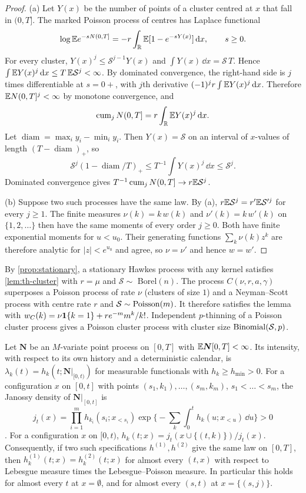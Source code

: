 \begin{proof}
(a) Let $Y(x)$ be the number of points of a cluster centred at $x$ that fall in
$(0,T]$. The marked Poisson process of centres has Laplace functional
\[
\log\mathbb{E} e^{-sN(0,T]}=-r\int_{\mathbb R}\mathbb{E}[1-e^{-sY(x)}]\,\mathrm{d} x,\qquad s\ge0 .
\]
For every cluster, $Y(x)^j\le \mathcal S^{j-1}Y(x)$ and $\int Y(x)\,\dd x=\mathcal S\,T$. Hence
$\int\mathbb{E} Y(x)^j\,\mathrm{d} x\le T\,\mathbb{E} \mathcal S^j<\infty$. By dominated convergence, the right-hand
side is $j$ times differentiable at $s=0+$, with $j$th derivative
$(-1)^jr\int\mathbb{E} Y(x)^j\,\mathrm{d} x$. Therefore $\mathbb{E} N(0,T]^j<\infty$ by monotone convergence,
and
\[
\operatorname{cum}_jN(0,T]=r\int_{\mathbb R}\mathbb{E} Y(x)^j\,\mathrm{d} x .
\]
Let $\operatorname{diam}=\max_iy_i-\min_iy_i$. Then $Y(x)=\mathcal S$ on an interval of
$x$-values of length $(T-\operatorname{diam})_+$, so
\[
\mathcal S^j(1-\operatorname{diam}/T)_+\le T^{-1}\int Y(x)^j\,\dd x\le \mathcal S^j .
\]
Dominated convergence gives $T^{-1}\operatorname{cum}_jN(0,T]\to r\mathbb{E} \mathcal S^j$.

(b) Suppose two such processes have the same law. By (a), $r\mathbb{E} \mathcal S^j=r'\mathbb{E} \mathcal S'^j$ for every
$j\ge1$. The finite measures $\nu(k)=k\,w(k)$ and $\nu'(k)=k\,w'(k)$ on
$\{1,2,\dots\}$ then have the same moments of every order $j\ge0$. Both have finite
exponential moments for $u<u_0$. Their generating functions
$\sum_k\nu(k)z^k$ are therefore analytic for $|z|<e^{u_0}$ and agree, so
$\nu=\nu'$ and hence $w=w'$.
\end{proof}

By \cref{prop:stationary}, a stationary Hawkes process with any kernel satisfies
\cref{lem:th-cluster} with $r=\mu$ and $\mathcal S\sim$ Borel$(n)$. The process
$C(\nu,r,a,\gamma)$ superposes a Poisson process of rate $\nu$ (clusters of size $1$)
and a Neyman--Scott process with centre rate $r$ and $\mathcal S\sim\operatorname{Poisson}(m)$. It therefore satisfies
the lemma with $w_C(k)=\nu\mathbf{1}\!\left\{k=1\right\}+r e^{-m}m^k/k!$. Independent $p$-thinning of a
Poisson cluster process gives a Poisson cluster process with cluster size
$\operatorname{Binomial}(\mathcal S,p)$.

\begin{lemma}\label{lem:th-janossy}
Let $\bm N$ be an $M$-variate point process on $[0,T]$ with $\mathbb{E}\bm N[0,T]<\infty$. Its
intensity, with respect to its own history and a deterministic calendar, is
$\lambda_k(t)=h_k(t;\bm N|_{[0,t)})$ for measurable functionals with
$h_k\ge h_{\min}>0$. For a configuration $x$ on $[0,t]$ with points
$(s_1,k_1),\dots,(s_m,k_m)$, $s_1<\dots<s_m$, the Janossy density of
$\bm N|_{[0,t]}$ is
\[
j_t(x)=\prod_{i=1}^m h_{k_i}(s_i;x_{<s_i})\exp\Big\{-\sum_k\int_0^t h_k(u;x_{<u})\,\dd u\Big\}>0
\]
\citep[Ch.~7]{daley2003}. For a configuration $x$ on $[0,t)$,
$h_k(t;x)=j_t(x\cup\{(t,k)\})/j_t(x)$. Consequently, if two such specifications
$h^{(1)},h^{(2)}$ give the same law on $[0,T]$, then
$h^{(1)}_k(t;x)=h^{(2)}_k(t;x)$ for almost every $(t,x)$ with respect to Lebesgue
measure times the Lebesgue--Poisson measure. In particular this holds for almost every
$t$ at $x=\emptyset$, and for almost every $(s,t)$ at $x=\{(s,j)\}$.
\end{lemma}

